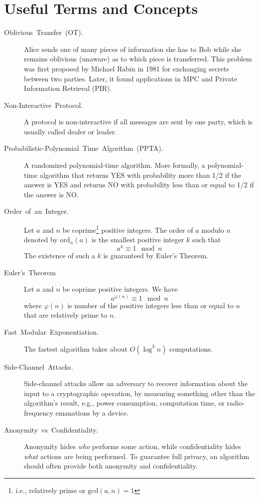 \documentclass[11pt]{article}
\theoremstyle{plain}
\begin{document}
\section{Useful Terms and Concepts}
\begin{description}
	\item [{Oblivious~Transfer~(OT).}] Alice sends one of many pieces of
	information she has to Bob while she remains oblivious (unaware) as
	to which piece is transferred. This problem was first proposed by
	Michael Rabin in 1981 for exchanging secrets between two parties.
	Later, it found applications in MPC and Private Information Retrieval
	(PIR).
	\item [{Non-Interactive~Protocol.}] A protocol is non-interactive if all
	messages are sent by one party, which is usually called dealer or
	leader.
	\item [{Probabilistic-Polynomial~Time~Algorithm~(PPTA).}] A randomized
	polynomial-time algorithm. More formally, a polynomial-time algorithm
	that returns YES with probability more than 1/2 if the answer is YES
	and returns NO with probability less than or equal to 1/2 if the answer
	is NO.
	\item [{Order~of~an~Integer.}] Let $a$ and $n$ be coprime\footnote{i.e., relatively prime or $\mathrm{gcd}(a,n)=1$}
	positive integers. The order of $a$ modulo $n$ denoted by $\mathrm{ord}_{n}(a)$
	is the smallest positive integer $k$ such that 
	\[
	a^{k}\equiv1\mod n
	\]
	The existence of such a $k$ is guaranteed by Euler's Theorem.
	\item [{Euler's~Theorem}] Let $a$ and $n$ be coprime positive integers.
	We have 
	\[
	a^{\varphi(n)}\equiv1\mod{n}
	\]
	where $\varphi(n)$ is number of the positive integers less than or
	equal to $n$ that are relatively prime to $n$.
	\item [{Fast~Modular~Exponentiation.}] The fastest algorithm takes about
	$O(\log^{3}{n})$ computations.
	\item [{Side-Channel~Attacks.}] Side-channel attacks allow an adversary
	to recover information about the input to a cryptographic operation,
	by measuring something other than the algorithm's result, e.g., power
	consumption, computation time, or radio-frequency emanations by a
	device.
	\item [{Anonymity~vs~Confidentiality.}] Anonymity hides \emph{who} performs
	some action, while confidentiality hides \emph{what} actions are being
	performed. To guarantee full privacy, an algorithm should often provide
	both anonymity and confidentiality.
\end{description}


\end{document}
